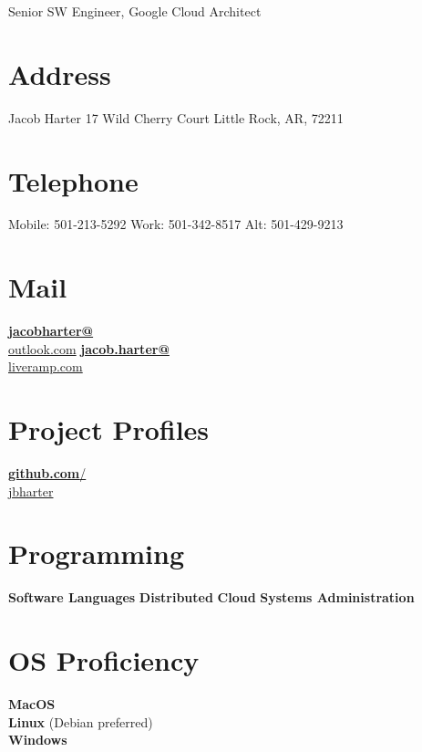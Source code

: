 \documentclass[]{friggeri-cv}
\begin{document}
      {Senior SW Engineer, Google Cloud Architect}


\begin{aside}
  \section{Address}
    Jacob Harter
    17 Wild Cherry Court
    Little Rock, AR, 72211
    ~
  \section{Telephone}
  Mobile: 501-213-5292
  Work: 501-342-8517
  Alt: 501-429-9213
    ~
  \section{Mail}
    \href{mailto:jacobharter@outlook.com}{\textbf{jacobharter@}\\outlook.com}
    \href{mailto:jacob.harter@liveramp.com}{\textbf{jacob.harter@}\\liveramp.com}
    ~
  \section{Project Profiles}
    \href{https://github.com/jbharter}{\textbf{github.com}/\\jbharter}
    ~
  \section{Programming}
        \textbf{Software Languages}
        {}
        \textbf{Distributed}
        {}
        \textbf{Cloud}
        {}
        \textbf{Systems Administration}
        {}
    ~
  \section{OS Proficiency}
    \textbf{MacOS}\\ %
    \textbf{Linux} (Debian preferred) \\  %
    \textbf{Windows}%
    ~
\end{aside}
\end{document}
